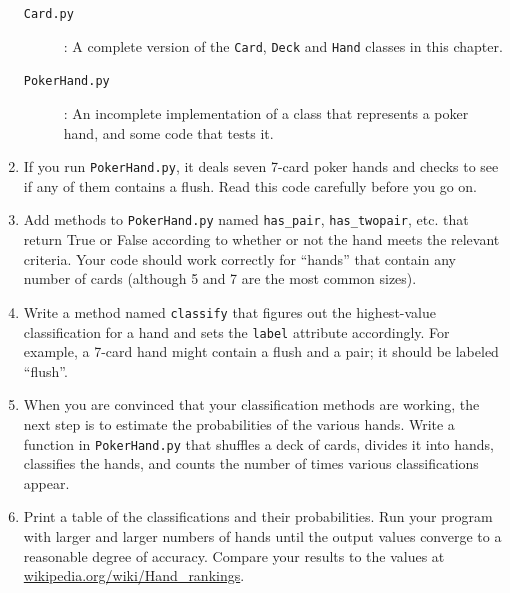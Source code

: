 \documentclass[10pt]{book}
\begin{document}
\begin{ex}
\begin{enumerate}
\begin{description}

\item[{\tt Card.py}]: A complete version of the {\tt Card},
{\tt Deck} and {\tt Hand} classes in this chapter.

\item[{\tt PokerHand.py}]: An incomplete implementation of a class
that represents a poker hand, and some code that tests it.

\end{description}
%
\item If you run {\tt PokerHand.py}, it deals seven 7-card poker hands
and checks to see if any of them contains a flush.  Read this
code carefully before you go on.

\item Add methods to {\tt PokerHand.py} named \verb"has_pair",
\verb"has_twopair", etc. that return True or False according to
whether or not the hand meets the relevant criteria.  Your code should
work correctly for ``hands'' that contain any number of cards
(although 5 and 7 are the most common sizes).

\item Write a method named {\tt classify} that figures out
the highest-value classification for a hand and sets the
{\tt label} attribute accordingly.  For example, a 7-card hand
might contain a flush and a pair; it should be labeled ``flush''.

\item When you are convinced that your classification methods are
working, the next step is to estimate the probabilities of the various
hands.  Write a function in {\tt PokerHand.py} that shuffles a deck of
cards, divides it into hands, classifies the hands, and counts the
number of times various classifications appear.

\item Print a table of the classifications and their probabilities.
Run your program with larger and larger numbers of hands until the
output values converge to a reasonable degree of accuracy.  Compare
your results to the values at \url{wikipedia.org/wiki/Hand_rankings}.

\end{enumerate}
\end{ex}
\end{document}
